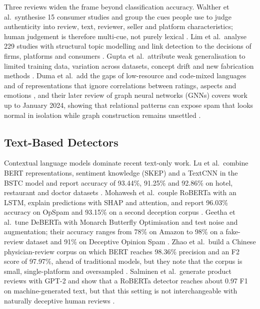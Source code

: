 Three reviews widen the frame beyond classification accuracy. Walther et al.\ synthesise 15 consumer studies and group the cues people use to judge authenticity into review, text, reviewer, seller and platform characteristics; human judgement is therefore multi-cue, not purely lexical \cite{ref19}. Lim et al.\ analyse 229 studies with structural topic modelling and link detection to the decisions of firms, platforms and consumers \cite{ref9}. Gupta et al.\ attribute weak generalisation to limited training data, variation across datasets, concept drift and new fabrication methods \cite{ref7}. Duma et al.\ add the gaps of low-resource and code-mixed languages and of representations that ignore correlations between ratings, aspects and emotions \cite{ref4}, and their later review of graph neural networks (GNNs) covers work up to January 2024, showing that relational patterns can expose spam that looks normal in isolation while graph construction remains unsettled \cite{ref3}.

\subsection{Text-Based Detectors}
Contextual language models dominate recent text-only work. Lu et al.\ combine BERT representations, sentiment knowledge (SKEP) and a TextCNN in the BSTC model and report accuracy of 93.44\%, 91.25\% and 92.86\% on hotel, restaurant and doctor datasets \cite{ref11}. Mohawesh et al.\ couple RoBERTa with an LSTM, explain predictions with SHAP and attention, and report 96.03\% accuracy on OpSpam and 93.15\% on a second deception corpus \cite{ref15}. Geetha et al.\ tune DeBERTa with Monarch Butterfly Optimisation and test noise and augmentation; their accuracy ranges from 78\% on Amazon to 98\% on a fake-review dataset and 91\% on Deceptive Opinion Spam \cite{ref6}. Zhao et al.\ build a Chinese physician-review corpus on which BERT reaches 98.36\% precision and an F2 score of 97.97\%, ahead of traditional models, but they note that the corpus is small, single-platform and oversampled \cite{ref20}. Salminen et al.\ generate product reviews with GPT-2 and show that a RoBERTa detector reaches about 0.97 F1 on machine-generated text, but that this setting is not interchangeable with naturally deceptive human reviews \cite{ref17}.

